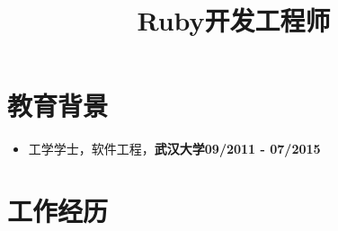 \documentclass[11pt, a4paper,sans]{moderncv}     %
\title{\yahei \LARGE Ruby开发工程师}
\begin{document}
\makecvtitle
\vspace{-38pt}

\section{\yahei 教育背景}
\begin{itemize}
  \item{\yahei 工学学士，软件工程，\textbf{武汉大学}\hfill\textbf{09/2011 - 07/2015}}
\end{itemize}

\vspace{-8pt}

\section{\yahei 工作经历}
\end{document}
